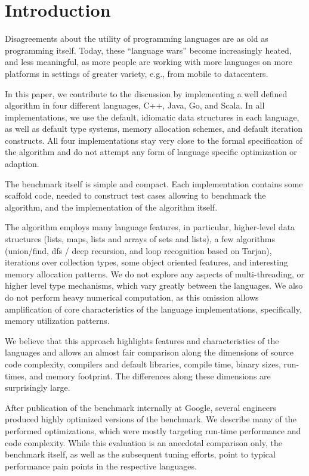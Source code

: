

\section{Introduction}

Disagreements about the utility of programming languages are
as old as programming itself. Today,
these ``language wars'' become increasingly heated, and less meaningful, as
more people are working with more languages on more platforms in settings of
greater variety, e.g., from mobile to datacenters.

In this paper, we contribute to the discussion by implementing a well
defined algorithm in four different languages, C++, Java, Go, and
Scala. In all implementations, we use the default, idiomatic data
structures in each language, as well as default type systems, memory
allocation schemes, and default iteration constructs. All four
implementations stay very close to the formal specification of the
algorithm and do not attempt any form of language specific
optimization or adaption.

The benchmark itself is simple and compact. Each implementation
contains some scaffold code, needed to construct test cases
allowing to benchmark the algorithm, and the implementation of the
algorithm itself.

The algorithm employs many language features, in particular,
higher-level data structures (lists, maps, lists and arrays of sets
and lists), a few algorithms (union/find, dfs / deep recursion, and
loop recognition based on Tarjan), iterations over collection types,
some object oriented features, and interesting memory allocation
patterns.  We do not explore any aspects of multi-threading, or higher
level type mechanisms, which vary greatly between the languages. We
also do not perform heavy numerical computation, as this omission
allows amplification of core characteristics of the language
implementations, specifically, memory utilization
patterns.

We believe that this approach highlights features and characteristics
of the languages and allows an almost fair comparison along the
dimensions of source code complexity, compilers and default libraries,
compile time,
binary sizes, run-times, and memory footprint. The differences along
these dimensions are surprisingly large.

After publication of the benchmark internally at Google, several
engineers produced highly optimized versions of the benchmark.  We
describe many of the performed optimizations, which were mostly
targeting run-time performance and code complexity. While this
evaluation is an anecdotal comparison only, the benchmark itself, as
well as the subsequent tuning efforts, point to typical performance
pain points in the respective languages.

